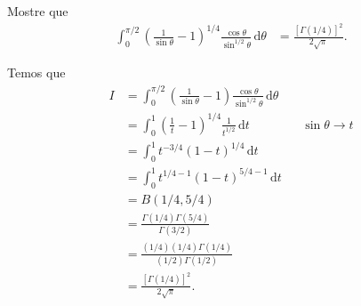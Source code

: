\documentclass[a4paper,12pt, leqno, answers]{exam}
\begin{document}
\begin{questions}
    \question[P1 de 2012] Mostre que
    \begin{align*}
        \int_0^{\pi/2} \left( \frac{1}{\sin \theta} - 1 \right)^{1/4} \frac{\cos \theta}{\sin^{1/2} \theta} \,\mathrm{d}\theta &= \frac{\left[ \Gamma(1/4) \right]^2}{2 \sqrt{\pi}}.
    \end{align*}
    \begin{solution}
        Temos que
        \begin{align*}
            I &= \int_0^{\pi/2} \left( \frac{1}{\sin \theta} - 1 \right) \frac{\cos \theta}{\sin^{1/2} \theta} \,\mathrm{d}\theta \\
            &= \int_0^1 \left( \frac{1}{t} - 1 \right)^{1/4} \frac{1}{t^{1/2}} \,\mathrm{d}t && \sin \theta \to t \\
            &= \int_0^1 t^{-3/4} \left( 1 - t \right)^{1/4} \,\mathrm{d}t \\
            &= \int_0^1 t^{1/4 - 1} \left( 1 - t \right)^{5/4 - 1} \,\mathrm{d}t \\
            &= B(1/4, 5/4) \\
            &= \frac{\Gamma(1/4) \Gamma(5/4)}{\Gamma(3/2)} \\
            &= \frac{(1/4) (1/4) \Gamma(1/4)}{(1/2) \Gamma(1/2)} \\
            &= \frac{\left[ \Gamma(1/4) \right]^2}{2 \sqrt{\pi}}.
        \end{align*}
    \end{solution}
\end{questions}
\end{document}
